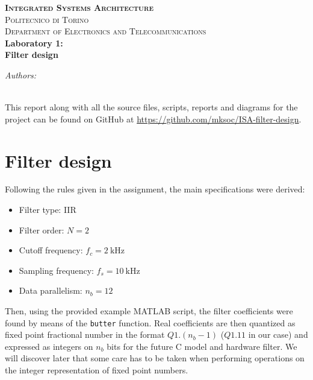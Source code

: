 \documentclass[a4paper]{article}
\author{Marco Andorno (247222)\\ Michele Caon (253027) \\ Matteo Perotti (251453) \\ Giuseppe Sarda (255648)}
\begin{document}
\begin{center}
\thispagestyle{empty}


\textbf{\textsc{\Large Integrated Systems Architecture}}\\[1.0cm] 
\textsc{\Large Politecnico di Torino}\\[0.5cm] 
\textsc{\large Department of Electronics and Telecommunications
}\\[1cm] 


\huge \textbf{Laboratory 1: \\ Filter design}

\end{center}


\vfill
\large
\begin{flushleft}
\makeatletter
\emph{Authors:}\\
\@author \\
\vspace{1cm}
\normalsize \@date
\makeatother
\end{flushleft} 

\newpage
This report along with all the source files, scripts, reports and diagrams for the project can be found on GitHub at \url{https://github.com/mksoc/ISA-filter-design}.
\tableofcontents
\newpage

\section{Filter design}
Following the rules given in the assignment, the main specifications were derived:
\begin{itemize}
    \item Filter type: IIR
    \item Filter order: \(N = 2\)
    \item Cutoff frequency: $f_c = \SI{2}{\kilo\hertz}$
    \item Sampling frequency: $f_s = \SI{10}{\kilo\hertz}$
    \item Data parallelism: $n_b = 12$
\end{itemize}
Then, using the provided example MATLAB script, the filter coefficients were found by means of the \texttt{butter} function. Real coefficients are then quantized as fixed point fractional number in the format $Q1.(n_b-1)$ ($Q1.11$ in our case) and expressed as integers on $n_b$ bits for the future C model and hardware filter. We will discover later that some care has to be taken when performing operations on the integer representation of fixed point numbers. 
\end{document}
